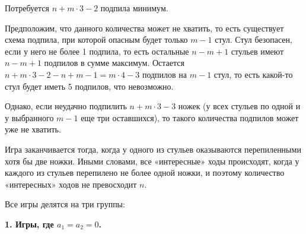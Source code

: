 ﻿
\begin{itemize}
\itA {}

\itB 


Потребуется $n + m \cdot 3 - 2$ подпила минимум.

Предположим, что данного количества может не хватить, то есть существует
схема подпила, при которой опасным будет только $m-1$ стул. 
Стул безопасен, если у него не более 1 подпила, 
то есть остальные $n-m+1$ стульев имеют $n-m+1$ подпилов в сумме максимум.
Остается $n + m \cdot 3 - 2 - n + m -1 = m \cdot 4 - 3$ подпилов на $m-1$ стул,
то есть какой-то стул будет иметь 5 подпилов, что невозможно.

Однако, если неудачно подпилить $n + m \cdot 3 - 3$ ножек (у всех стульев по
одной и у выбранного $m-1$ еще три оставшихся), то такого количества
подпилов может уже не хватить.

\iffalse {
	В кафе $n$ четырехногих стульев. Стул падает, если у него меньше 
	трех целых ножек. У мальчиков Васи и Пети есть две пилы, и они изобретают 
	себе игру. Мальчики уже сошлись на том, что первым ходит Петя, а проигрывает 
	тот, после чьего хода упадет первый стул. Осталось выбрать возможное число 
	перепиливаний за ход для каждого из них. Пусть за каждый ход Петя 
	перепиливает не менее чем $a_1$ и не более чем $b_1$ ножек, Вася — от $a_2$ до 
	$b_2$ ножек. Числа $a_1$ и $a_2$ могут быть равны нулю или единице, а 
	числа $b_1$ и $b_2$ — $m$ или $m-1$, $m<n$, но при этом обязательно $b_1 \ne b_2$. 
	Сколько игр удовлетворяет этим условиям, и кто из мальчиков выиграет в каждой из них?
} \fi

\itC Игра заканчивается тогда, когда у одного из стульев оказываются перепиленными
хотя бы две ножки. Иными словами, все «интересные» ходы происходят, когда у каждого
из стульев перепилено не более одной ножки, и поэтому количество «интересных» ходов
не превосходит $n$.

Все игры делятся на три группы:

\begin{center} \bfseries
	1. Игры, где $a_1 = a_2 = 0$.
\end{center}


\end{itemize}
